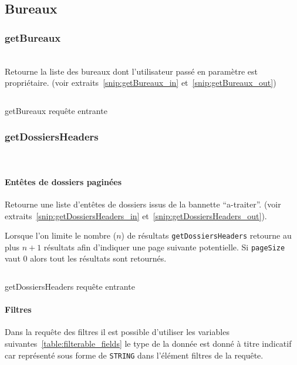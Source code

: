 \subsection{Bureaux}

\subsubsection{getBureaux}
\\

Retourne la liste des bureaux dont l'utilisateur passé en paramètre est propriétaire. (voir extraits~\ref{snip:getBureaux_in} et~\ref{snip:getBureaux_out}) 

\begin{codesnippet}
\inputminted[frame=single,linenos,fontsize=\footnotesize]{javascript}{extraits/getBureaux_in.js}
\caption{getBureaux requête entrante}
\label{snip:getBureaux_in}
\end{codesnippet}

\subsubsection{getDossiersHeaders}
\\

\paragraph{Entêtes de dossiers paginées}

Retourne une liste d'entêtes de dossiers issus de la bannette ``a-traiter''. (voir extraits~\ref{snip:getDossiersHeaders_in} et~\ref{snip:getDossiersHeaders_out}).

Lorsque l'on limite le nombre ($n$) de résultats \verb|getDossiersHeaders| retourne au plus $n + 1$ résultats afin d'indiquer une page suivante potentielle. Si \verb|pageSize| vaut 0 alors tout les résultats sont retournés.

\begin{codesnippet}
\inputminted[frame=single,linenos,fontsize=\footnotesize]{javascript}{extraits/getDossiersHeaders_in.js}
\caption{getDossiersHeaders requête entrante}
\label{snip:getDossiersHeaders_in}
\end{codesnippet}

\paragraph{Filtres}
Dans la requête des filtres il est possible d'utiliser les variables suivantes~\ref{table:filterable_fields} le type de la donnée est donné à titre indicatif car représenté sous forme de \verb|STRING| dans l'élément filtres de la requête.


